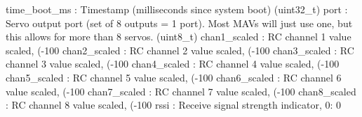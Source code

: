 \begin{DoxyVerb}
\begin{DoxyVerb}
\begin{DoxyVerb}
\begin{DoxyVerb}
\begin{DoxyVerb}
\begin{DoxyVerb}
\begin{DoxyVerb}
\begin{DoxyVerb}
\begin{DoxyVerb}
time_boot_ms              : Timestamp (milliseconds since system boot) (uint32_t)
port                      : Servo output port (set of 8 outputs = 1 port). Most MAVs will just use one, but this allows for more than 8 servos. (uint8_t)
chan1_scaled              : RC channel 1 value scaled, (-100%
chan2_scaled              : RC channel 2 value scaled, (-100%
chan3_scaled              : RC channel 3 value scaled, (-100%
chan4_scaled              : RC channel 4 value scaled, (-100%
chan5_scaled              : RC channel 5 value scaled, (-100%
chan6_scaled              : RC channel 6 value scaled, (-100%
chan7_scaled              : RC channel 7 value scaled, (-100%
chan8_scaled              : RC channel 8 value scaled, (-100%
rssi                      : Receive signal strength indicator, 0: 0%
 \mbox{\label{classpymavlink_1_1dialects_1_1v10_1_1MAVLink_a3533e622bea4f92702fe425b99ee6abb}} 

\end{DoxyVerb}
\end{DoxyVerb}
\end{DoxyVerb}
\end{DoxyVerb}
\end{DoxyVerb}
\end{DoxyVerb}
\end{DoxyVerb}
\end{DoxyVerb}
\end{DoxyVerb}
